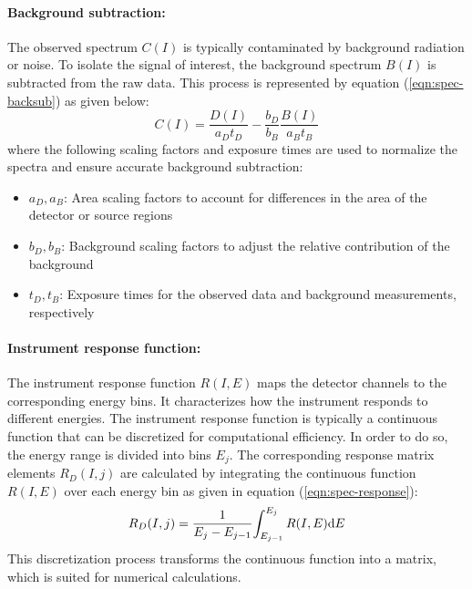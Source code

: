     			\paragraph{Background subtraction:}
    			The observed spectrum $C(I)$ is typically contaminated by background radiation or noise. To isolate the signal of interest, the background spectrum $B(I)$ is subtracted from the raw data. This process is represented by equation (\ref{eqn:spec-backsub}) as given below:
    			\begin{equation}
					C(I)=\dfrac{D(I)}{a_Dt_D}-\dfrac{b_D}{b_B}\dfrac{B(I)}{a_B t_B} \label{eqn:spec-backsub}
				\end{equation}
				where the following scaling factors and exposure times are used to normalize the spectra and ensure accurate background subtraction:
				\begin{itemize}
					\item $a_D,a_B$: Area scaling factors to account for differences in the area of the detector or source regions
					\item $b_D,b_B$: Background scaling factors to adjust the relative contribution of the background
					\item $t_D,t_B$: Exposure times for the observed data and background measurements, respectively
				\end{itemize}
				
				\paragraph{Instrument response function:}
				The instrument response function $R(I,E)$ maps the detector channels to the corresponding energy bins. It characterizes how the instrument responds to different energies. The instrument response function is typically a continuous function that can be discretized for computational efficiency. In order to do so, the energy range is divided into bins $E_j$. The corresponding response matrix elements $R_D(I,j)$ are calculated by integrating the continuous function $R(I,E)$ over each energy bin as given in equation (\ref{eqn:spec-response}):
				\begin{equation}
					R_D(I,j)=\dfrac{1}{E_j-E_{j-1}}{\int_{E_{j-1}}^{E_j}{R(I,E)\mathrm{d}E}} \label{eqn:spec-response}
				\end{equation}
				This discretization process transforms the continuous function into a matrix, which is suited for numerical calculations.
				
